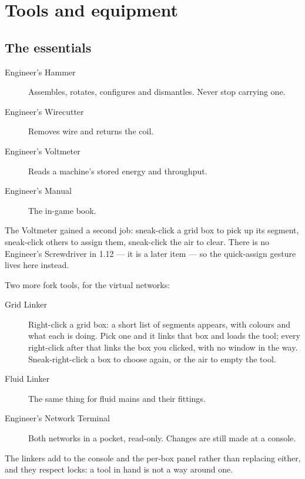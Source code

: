 \chapter{Tools and equipment}
\label{ch:tools}

\section{The essentials}

\begin{description}
\item[Engineer's Hammer] Assembles, rotates, configures and dismantles. Never stop carrying one.
\item[Engineer's Wirecutter] Removes wire and returns the coil.
\item[Engineer's Voltmeter] Reads a machine's stored energy and throughput.
\item[Engineer's Manual] The in-game book.
\end{description}

\begin{iefork}
The Voltmeter gained a second job: sneak-click a grid box to pick up its segment, sneak-click others
to assign them, sneak-click the air to clear. There is no Engineer's Screwdriver in 1.12 --- it is a
later item --- so the quick-assign gesture lives here instead.
\end{iefork}

\begin{iefork}
Two more fork tools, for the virtual networks:

\begin{description}
\item[Grid Linker] Right-click a grid box: a short list of segments appears, with colours and what
      each is doing. Pick one and it links that box and loads the tool; every right-click after that
      links the box you clicked, with no window in the way. Sneak-right-click a box to choose again,
      or the air to empty the tool.
\item[Fluid Linker] The same thing for fluid mains and their fittings.
\item[Engineer's Network Terminal] Both networks in a pocket, read-only. Changes are still made at a
      console.
\end{description}

The linkers add to the console and the per-box panel rather than replacing either, and they respect
locks: a tool in hand is not a way around one.
\end{iefork}

